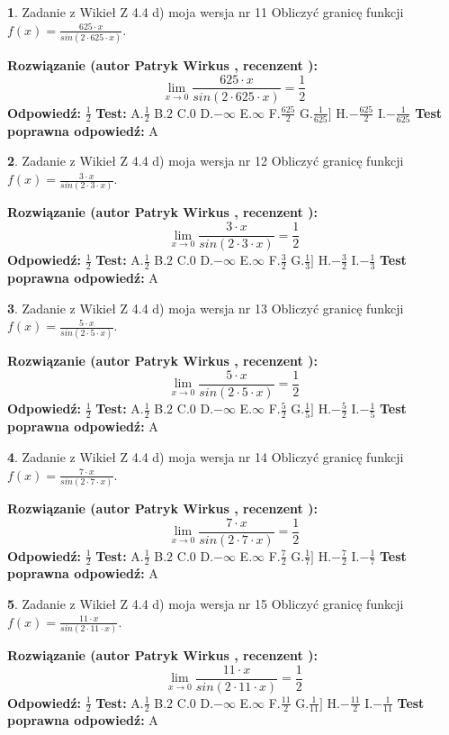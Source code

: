 \documentclass[12pt, a4paper]{article}
\theoremstyle{definition} %
\newtheorem{zad}{}
\newcommand{\zadStart}[1]{\begin{zad}#1\newline}
\newcommand{\zadStop}{\end{zad}}
\newcommand{\rozwStart}[2]{\noindent \textbf{Rozwiązanie (autor #1 , recenzent #2): }\newline}
\newcommand{\rozwStop}{\newline}
\newcommand{\odpStart}{\noindent \textbf{Odpowiedź:}\newline}
\newcommand{\odpStop}{\newline}
\newcommand{\testStart}{\noindent \textbf{Test:}\newline}
\newcommand{\testStop}{\newline}
\newcommand{\kluczStart}{\noindent \textbf{Test poprawna odpowiedź:}\newline}
\newcommand{\kluczStop}{\newline}
\begin{document}
\zadStart{Zadanie z Wikieł Z 4.4 d) moja wersja nr 11}
Obliczyć granicę funkcji $f(x)=\frac{625\cdot x}{sin(2 \cdot625\cdot x)}$.
\zadStop
\rozwStart{Patryk Wirkus}{}
$$\lim\limits_{x\to 0}\frac{625\cdot x}{sin(2 \cdot625\cdot x)}=\frac{1}{2}$$
\rozwStop
\odpStart
$\frac{1}{2}$
\odpStop
\testStart
A.$\frac{1}{2}$
B.$2$
C.$0$
D.$-\infty$
E.$\infty$
F.$\frac{625}{2}$
G.$\frac{1}{625}]$
H.$-\frac{625}{2}$
I.$-\frac{1}{625}$
\testStop
\kluczStart
A
\kluczStop



\zadStart{Zadanie z Wikieł Z 4.4 d) moja wersja nr 12}
Obliczyć granicę funkcji $f(x)=\frac{3\cdot x}{sin(2 \cdot3\cdot x)}$.
\zadStop
\rozwStart{Patryk Wirkus}{}
$$\lim\limits_{x\to 0}\frac{3\cdot x}{sin(2 \cdot3\cdot x)}=\frac{1}{2}$$
\rozwStop
\odpStart
$\frac{1}{2}$
\odpStop
\testStart
A.$\frac{1}{2}$
B.$2$
C.$0$
D.$-\infty$
E.$\infty$
F.$\frac{3}{2}$
G.$\frac{1}{3}]$
H.$-\frac{3}{2}$
I.$-\frac{1}{3}$
\testStop
\kluczStart
A
\kluczStop



\zadStart{Zadanie z Wikieł Z 4.4 d) moja wersja nr 13}
Obliczyć granicę funkcji $f(x)=\frac{5\cdot x}{sin(2 \cdot5\cdot x)}$.
\zadStop
\rozwStart{Patryk Wirkus}{}
$$\lim\limits_{x\to 0}\frac{5\cdot x}{sin(2 \cdot5\cdot x)}=\frac{1}{2}$$
\rozwStop
\odpStart
$\frac{1}{2}$
\odpStop
\testStart
A.$\frac{1}{2}$
B.$2$
C.$0$
D.$-\infty$
E.$\infty$
F.$\frac{5}{2}$
G.$\frac{1}{5}]$
H.$-\frac{5}{2}$
I.$-\frac{1}{5}$
\testStop
\kluczStart
A
\kluczStop



\zadStart{Zadanie z Wikieł Z 4.4 d) moja wersja nr 14}
Obliczyć granicę funkcji $f(x)=\frac{7\cdot x}{sin(2 \cdot7\cdot x)}$.
\zadStop
\rozwStart{Patryk Wirkus}{}
$$\lim\limits_{x\to 0}\frac{7\cdot x}{sin(2 \cdot7\cdot x)}=\frac{1}{2}$$
\rozwStop
\odpStart
$\frac{1}{2}$
\odpStop
\testStart
A.$\frac{1}{2}$
B.$2$
C.$0$
D.$-\infty$
E.$\infty$
F.$\frac{7}{2}$
G.$\frac{1}{7}]$
H.$-\frac{7}{2}$
I.$-\frac{1}{7}$
\testStop
\kluczStart
A
\kluczStop



\zadStart{Zadanie z Wikieł Z 4.4 d) moja wersja nr 15}
Obliczyć granicę funkcji $f(x)=\frac{11\cdot x}{sin(2 \cdot11\cdot x)}$.
\zadStop
\rozwStart{Patryk Wirkus}{}
$$\lim\limits_{x\to 0}\frac{11\cdot x}{sin(2 \cdot11\cdot x)}=\frac{1}{2}$$
\rozwStop
\odpStart
$\frac{1}{2}$
\odpStop
\testStart
A.$\frac{1}{2}$
B.$2$
C.$0$
D.$-\infty$
E.$\infty$
F.$\frac{11}{2}$
G.$\frac{1}{11}]$
H.$-\frac{11}{2}$
I.$-\frac{1}{11}$
\testStop
\kluczStart
A
\kluczStop
\end{document}
